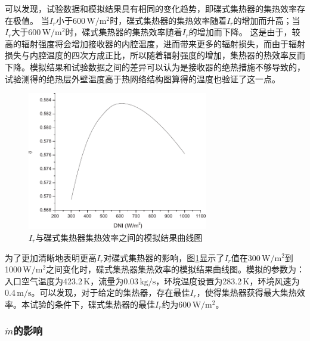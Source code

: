 可以发现，试验数据和模拟结果具有相同的变化趋势，即碟式集热器的集热效率存在极值。
当$I_r$小于600$\,\mathrm{W/m^2}$时，碟式集热器的集热效率随着$I_r$的增加而升高；当$I_r$大于600$\,\mathrm{W/m^2}$时，碟式集热器的集热效率随着$I_r$的增加而下降。
这是由于，较高的辐射强度将会增加接收器的内腔温度，进而带来更多的辐射损失，而由于辐射损失与内腔温度的四次方成正比，所以随着辐射强度的增加，集热器的热效率反而下降。模拟结果和试验数据之间的差异可以认为是接收器的绝热措施不够导致的，试验测得的绝热层外壁温度高于热网络结构图算得的温度也验证了这一点。

\begin{figure}[!ht]
\centering
\includegraphics[width=0.7\textwidth]{fig/HigherDNI-eta-dish}
\caption{$I_r$与碟式集热器集热效率之间的模拟结果曲线图}
\label{fig:HigherDNI-eta-dish}
\end{figure}
为了更加清晰地表明更高$I_r$对碟式集热器的影响，图\ref{fig:HigherDNI-eta-dish}显示了$I_r$值在300$\,\mathrm{W/m^2}$到1000$\,\mathrm{W/m^2}$之间变化时，碟式集热器集热效率的模拟结果曲线图。模拟的参数为：入口空气温度为423.2$\,\mathrm{K}$，流量为0.03$\,\mathrm{kg/s}$，环境温度设置为283.2$\,\mathrm{K}$，环境风速为0.4$\,\mathrm{m/s}$。可以发现，对于给定的集热器，存在最佳$I_r$，使得集热器获得最大集热效率。本试验的条件下，碟式集热器的最佳$I_r$约为600$\,\mathrm{W/m^2}$。

\subsubsection{$\dot{m}$的影响}

